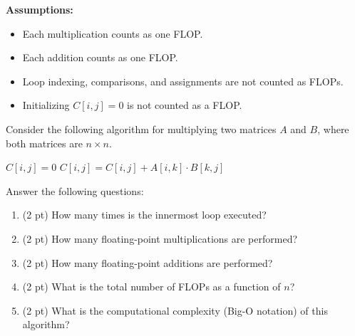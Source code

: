 \documentclass{ximera}
\begin{document}
\begin{exercise}


\textbf{Assumptions:}
\begin{itemize}
\setlength{\itemsep}{0.05em}
    \item Each multiplication counts as one FLOP.
    \item Each addition counts as one FLOP.
    \item Loop indexing, comparisons, and assignments
    are not counted as FLOPs.
    \item Initializing $C[i,j]=0$ is not counted as a FLOP.
\end{itemize}
Consider the following algorithm for multiplying two matrices $A$ and $B$, where both matrices are $n\times n$.

\begin{algorithm}
\caption{Matrix-Matrix Multiplication}
\begin{algorithmic}[1]
        \State $C[i,j] = 0$
            \State $C[i,j] = C[i,j] + A[i,k]\cdot B[k,j]$
        \EndFor
    \EndFor
\EndFor
\end{algorithmic}
\end{algorithm}

Answer the following questions:

\begin{enumerate}
    \item (2 pt) How many times is the innermost loop executed?
\vfill
    \item (2 pt) How many floating-point multiplications
    are performed?
\vfill
    \item (2 pt) How many floating-point additions
    are performed?
\vfill
    \item (2 pt) What is the total number of FLOPs
    as a function of $n$?
\vfill
    \item (2 pt) What is the computational complexity
    (Big-O notation) of this algorithm?
    \vfill
\end{enumerate}

\end{exercise} 
\end{document}
